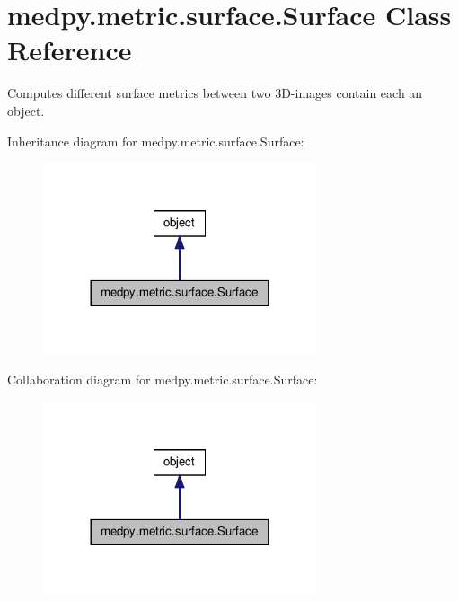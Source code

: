 \hypertarget{classmedpy_1_1metric_1_1surface_1_1Surface}{
\section{medpy.metric.surface.Surface Class Reference}
\label{classmedpy_1_1metric_1_1surface_1_1Surface}
}


Computes different surface metrics between two 3D-\/images contain each an object.  




Inheritance diagram for medpy.metric.surface.Surface:\nopagebreak
\begin{figure}[H]
\begin{center}
\leavevmode
\includegraphics[width=228pt]{classmedpy_1_1metric_1_1surface_1_1Surface__inherit__graph}
\end{center}
\end{figure}


Collaboration diagram for medpy.metric.surface.Surface:\nopagebreak
\begin{figure}[H]
\begin{center}
\leavevmode
\includegraphics[width=228pt]{classmedpy_1_1metric_1_1surface_1_1Surface__coll__graph}
\end{center}
\end{figure}
